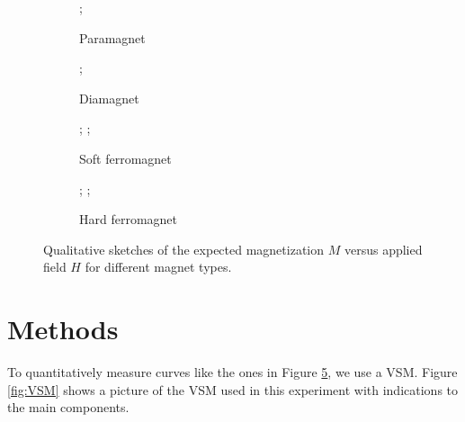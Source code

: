 \documentclass{../paper}
\begin{document}
\begin{figure}
  \centering
  \begin{subfigure}{0.45\columnwidth}
    \centering
    \begin{sketch}[
      xlabel = {$H$},
      ylabel = {$M$},
    ]
      ;
    \end{sketch}
    \caption{Paramagnet}
    \label{fig:paramagnet}
  \end{subfigure}
  \begin{subfigure}{0.45\columnwidth}
    \centering
    \begin{sketch}[
      xlabel = {$H$},
      ylabel = {$M$},
    ]
      ;
    \end{sketch}
    \caption{Diamagnet}
    \label{fig:diamagnet}
  \end{subfigure}
  \begin{subfigure}{0.45\columnwidth}
    \centering
    \begin{sketch}[
      xlabel = {$H$},
      ylabel = {$M$},
      samples = 100
    ]
      ;
      ;
    \end{sketch}
    \caption{Soft ferromagnet}
    \label{fig:soft-ferromagnet}
  \end{subfigure}
  \begin{subfigure}{0.45\columnwidth}
    \centering
    \begin{sketch}[
      xlabel = {$H$},
      ylabel = {$M$},
      samples = 100
    ]
      ;
      ;
    \end{sketch}
    \caption{Hard ferromagnet}
    \label{fig:hard-ferromagnet}
  \end{subfigure}

  \caption{Qualitative sketches of the expected magnetization $M$ versus applied field $H$ for different magnet types.}
  \label{fig:MH-curves}
\end{figure}

\section{Methods}\label{sec:methods}

To quantitatively measure curves like the ones in Figure \ref{fig:MH-curves}, we use a VSM. Figure \ref{fig:VSM} shows a picture of the VSM used in this experiment with indications to the main components.
\end{document}
